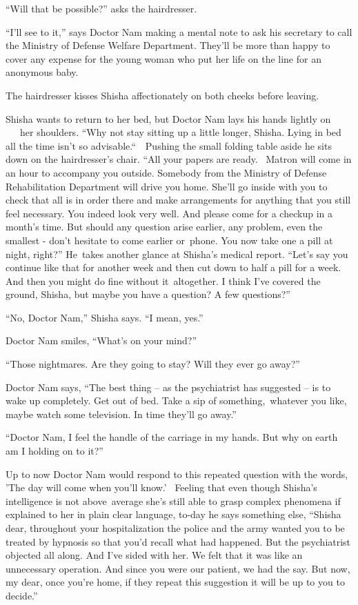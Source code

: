 \documentclass[twoside,11pt]{book}
\begin{document}
``Will that be possible?'' asks the hairdresser. 

``I'll see to it,'' says Doctor Nam making a mental note to ask his secretary to call the
Ministry of Defense Welfare Department. They'll be more than happy to cover any expense for the young woman who put her
life on the line for an anonymous baby.

The hairdresser kisses Shisha affectionately on both cheeks before leaving.

Shisha wants to return to her bed, but Doctor Nam lays his hands lightly on \ \ \ her shoulders. ``Why not
stay sitting up a little longer, Shisha. Lying in bed all the time isn't so advisable.``\ \ Pushing the
small folding table aside he sits down on the hairdresser's chair. ``All your papers are
ready.{~} Matron will come in an hour to accompany you outside. Somebody from the Ministry of Defense
Rehabilitation Department will drive you home. She'll go inside with you to check that all is in order there and make
arrangements for anything that you still feel necessary. You indeed look very well. And please come for a checkup in a
month's time.  But should any question arise earlier, any problem, even the smallest - don't hesitate to come earlier
or~phone. You now take one a pill at night, right?'' He~takes another glance at Shisha's medical report.
``Let's say you continue like that for another week and then cut down to half a pill for a week. And then
you might do fine without it\ altogether. I think I've covered the ground, Shisha, but maybe you have a question? A few
questions?'' 

``No, Doctor Nam,'' Shisha says. ``I mean, yes.'' 

Doctor Nam smiles, ``What's on your mind?'' 

``Those nightmares. Are they going to stay? Will they ever go away?'' 

Doctor Nam says, ``The best thing -- as the psychiatrist has suggested -- is to wake up completely. Get out
of bed. Take a sip of something,{\ }whatever you like, maybe watch some
television. In time they{}'ll go away.''

``Doctor Nam, I feel the handle of the carriage in my hands. But why on earth am I holding on to
it?'' 

Up to now Doctor Nam would respond to this repeated question with the words, 'The day will come when you'll know.'
~Feeling that even though Shisha{}'s intelligence is not above\ average she's still able to grasp complex phenomena if
explained to her in plain clear language, to-day he says something else, ``Shisha dear, throughout your
hospitalization the police and the army wanted you to be treated by hypnosis so that you'd recall what had happened.
But the psychiatrist objected all along. And I've sided with her. We felt that it was like an unnecessary operation.
And since you were our patient, we had the say. But now, my dear, once you're home, if they repeat this suggestion it
will be up to you to decide.'' 
\end{document}
